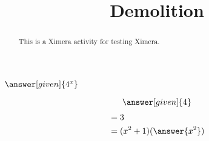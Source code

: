 \documentclass[web]{ximera}
\title{Demolition}
\begin{document}
\begin{abstract} %
  This is a Ximera activity for testing Ximera.
\end{abstract}
\maketitle


$\answer[given]{4^x}$

\[
\answer[given]{4}
\]
\begin{align*}
&= 3\\
&=(x^2+1)(\answer{x^2}) %
\end{align*}

\end{document}
